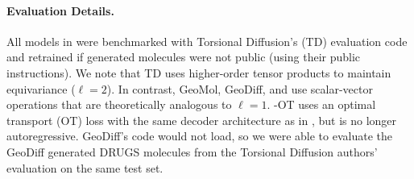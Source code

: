 \paragraph{Evaluation Details.} All models in  were benchmarked with Torsional Diffusion's (TD) evaluation code and retrained if generated molecules were not public (using their public instructions). We note that TD uses higher-order tensor products to maintain equivariance ($\ell = 2$). In contrast, GeoMol, GeoDiff, and \model use scalar-vector operations that are theoretically analogous to $\ell = 1$. \modelns-OT uses an optimal transport (OT) loss with the same decoder architecture as in , but is no longer autoregressive. GeoDiff's code would not load, so we were able to evaluate the GeoDiff generated DRUGS molecules from the Torsional Diffusion authors' evaluation on the same test set.

